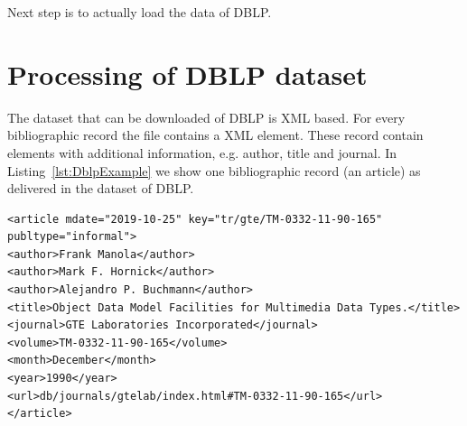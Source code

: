 \documentclass{ou-report}
\newcommand{\dblp}{DBLP}
\begin{document}
Next step is to actually load the data of \dblp{}.

\section{Processing of DBLP dataset}
The dataset that can be downloaded of DBLP is XML based. For every bibliographic
record the file contains a XML element. These record contain elements with 
additional information, e.g. author, title and journal. In 
Listing~\ref{lst:DblpExample} we show one bibliographic record (an article) as 
delivered in the dataset of DBLP.

\lstset{language=XML}
\begin{lstlisting}[caption={DBLP bibliografic record example},label={lst:DblpExample}]
<article mdate="2019-10-25" key="tr/gte/TM-0332-11-90-165" publtype="informal">
<author>Frank Manola</author>
<author>Mark F. Hornick</author>
<author>Alejandro P. Buchmann</author>
<title>Object Data Model Facilities for Multimedia Data Types.</title>
<journal>GTE Laboratories Incorporated</journal>
<volume>TM-0332-11-90-165</volume>
<month>December</month>
<year>1990</year>
<url>db/journals/gtelab/index.html#TM-0332-11-90-165</url>
</article>
\end{lstlisting}
\end{document}
